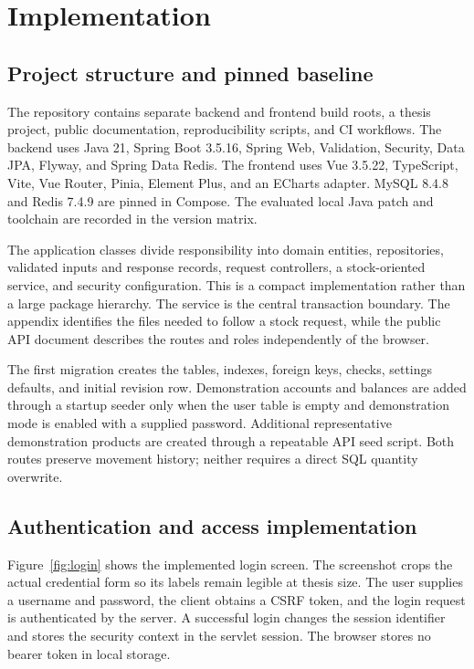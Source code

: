 \chapter{Implementation}\label{ch:implementation}
\section{Project structure and pinned baseline}
The repository contains separate backend and frontend build roots, a thesis project, public documentation, reproducibility scripts, and CI workflows. The backend uses Java 21, Spring Boot 3.5.16, Spring Web, Validation, Security, Data JPA, Flyway, and Spring Data Redis. The frontend uses Vue 3.5.22, TypeScript, Vite, Vue Router, Pinia, Element Plus, and an ECharts adapter. MySQL 8.4.8 and Redis 7.4.9 are pinned in Compose. The evaluated local Java patch and toolchain are recorded in the version matrix.

The application classes divide responsibility into domain entities, repositories, validated inputs and response records, request controllers, a stock-oriented service, and security configuration. This is a compact implementation rather than a large package hierarchy. The service is the central transaction boundary. The appendix identifies the files needed to follow a stock request, while the public API document describes the routes and roles independently of the browser.

The first migration creates the tables, indexes, foreign keys, checks, settings defaults, and initial revision row. Demonstration accounts and balances are added through a startup seeder only when the user table is empty and demonstration mode is enabled with a supplied password. Additional representative demonstration products are created through a repeatable API seed script. Both routes preserve movement history; neither requires a direct SQL quantity overwrite.

\section{Authentication and access implementation}
Figure~\ref{fig:login} shows the implemented login screen. The screenshot crops the actual credential form so its labels remain legible at thesis size. The user supplies a username and password, the client obtains a CSRF token, and the login request is authenticated by the server. A successful login changes the session identifier and stores the security context in the servlet session. The browser stores no bearer token in local storage.

